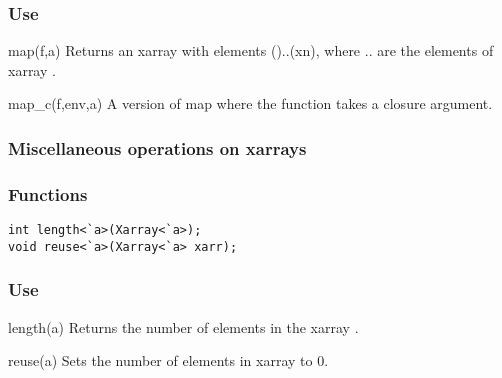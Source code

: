 \subsubsection*{Use}

\begin{defun}{map}{(f,a)}
Returns an xarray with elements ()..(xn), where
.. are the elements of xarray .
\end{defun}

\begin{defun}{map_c}{(f,env,a)}
A version of map where the function  takes a closure argument.
\end{defun}

\subsubsection*{Miscellaneous operations on xarrays}
\subsubsection*{Functions}
\begin{verbatim}
int length<`a>(Xarray<`a>);
void reuse<`a>(Xarray<`a> xarr);
\end{verbatim}

\subsubsection*{Use}

\begin{defun}{length}{(a)}
Returns the number of elements in the xarray .
\end{defun}

\begin{defun}{reuse}{(a)}
Sets the number of elements in xarray  to 0.
\end{defun}

